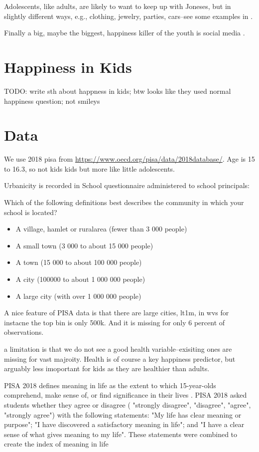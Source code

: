 \documentclass[10pt, letterpaper]{article}
\begin{document}
\begin{spacing}{1.4}
Adolescents, like adults, are likely to want to keep up with Joneses, but in
slightly different ways, e.g., clothing, jewelry, parties, cars--see some
examples in \citet{frank12}.

Finally a big, maybe the biggest, happiness killer of the youth is social media
\cite{twengeATL17sep,twenge14}.


\section{Happiness in Kids}

TODO: write sth about happness in kids; btw looks like they used normal happiness question; not smileys


\section{Data}

We use 2018 pisa from \url{https://www.oecd.org/pisa/data/2018database/}. Age is 15 to 16.3, so not kids kids but more like
little adolescents.

Urbanicity is recorded in  School questionnaire administered to school
principals:

Which of the following definitions best describes the community in which your school is located?
\begin{itemize}
\item A village, hamlet or ruralarea (fewer than 3 000 people)
\item A small town (3 000 to about 15 000 people)
\item A town (15 000 to about 100 000 people)
\item A city (100000 to about 1 000 000 people)
\item A large city (with over 1 000 000 people)
\end{itemize}

A nice feature of PISA data is that there are large cities, lt1m, in wvs for
instacne the top bin is only 500k. And it is missing for only 6 percent of
observations. 

a limitation is that we do not see a good health variable--exisiting ones are
missing for vast majroity. Health is of course a key happiness predictor, but
arguably less imoportant for kids as they are healthier than adults. 


PISA 2018 defines meaning in life as the extent to which 15-year-olds
comprehend, make sense of, or find significance in their lives
\citep{pisa18}. PISA 2018 asked students whether they agree or disagree (
"strongly disagree", "disagree", "agree", "strongly agree") with the following
statements: "My life has clear meaning or purpose"; "I have discovered a
satisfactory meaning in life"; and "I have a clear sense of what gives meaning
to my life". These statements were combined to create the index of meaning in
life


\end{spacing}
\end{document}
